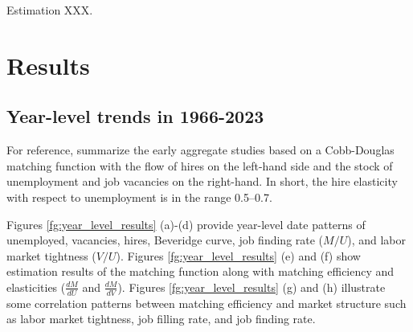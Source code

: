 \documentclass[12pt]{article}
\begin{document}
Estimation XXX.



\section{Results}

\subsection{Year-level trends in 1966-2023}

For reference, \cite{petrongolo2001looking} summarize the early aggregate studies based on a Cobb-Douglas matching function with the flow of hires on the left-hand side and the stock of unemployment and job vacancies on the right-hand. 
In short, the hire elasticity with respect to unemployment is in the range 0.5–0.7.

Figures \ref{fg:year_level_results} (a)-(d) provide year-level date patterns of unemployed, vacancies, hires, Beveridge curve, job finding rate ($M/U$), and labor market tightness ($V/U$). 
Figures \ref{fg:year_level_results} (e) and (f) show estimation results of the matching function along with matching efficiency and elasticities ($\frac{dM}{dU}$ and $\frac{dM}{dV}$).
Figures \ref{fg:year_level_results} (g) and (h) illustrate some correlation patterns between matching efficiency and market structure such as labor market tightness, job filling rate, and job finding rate.
\end{document}
